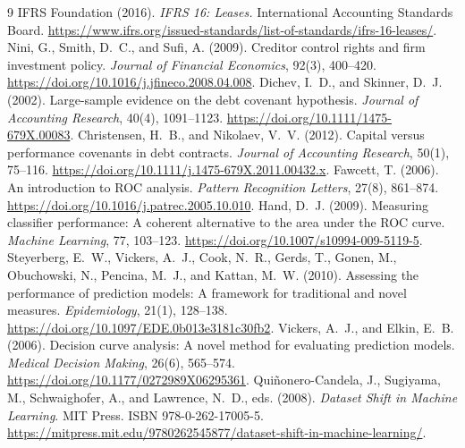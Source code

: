 \documentclass[11pt,a4paper]{article}
\begin{document}
\FloatBarrier
\begin{thebibliography}{9}
IFRS Foundation (2016). \emph{IFRS 16: Leases.}
International Accounting Standards Board.
\url{https://www.ifrs.org/issued-standards/list-of-standards/ifrs-16-leases/}.
Nini, G., Smith, D.~C., and Sufi, A. (2009).
Creditor control rights and firm investment policy.
\emph{Journal of Financial Economics}, 92(3), 400--420.
\url{https://doi.org/10.1016/j.jfineco.2008.04.008}.
Dichev, I.~D., and Skinner, D.~J. (2002).
Large-sample evidence on the debt covenant hypothesis.
\emph{Journal of Accounting Research}, 40(4), 1091--1123.
\url{https://doi.org/10.1111/1475-679X.00083}.
Christensen, H.~B., and Nikolaev, V.~V. (2012).
Capital versus performance covenants in debt contracts.
\emph{Journal of Accounting Research}, 50(1), 75--116.
\url{https://doi.org/10.1111/j.1475-679X.2011.00432.x}.
Fawcett, T. (2006).
An introduction to ROC analysis.
\emph{Pattern Recognition Letters}, 27(8), 861--874.
\url{https://doi.org/10.1016/j.patrec.2005.10.010}.
Hand, D.~J. (2009).
Measuring classifier performance: A coherent alternative to the area under the ROC curve.
\emph{Machine Learning}, 77, 103--123.
\url{https://doi.org/10.1007/s10994-009-5119-5}.
Steyerberg, E.~W., Vickers, A.~J., Cook, N.~R., Gerds, T., Gonen, M., Obuchowski, N., Pencina, M.~J., and Kattan, M.~W. (2010).
Assessing the performance of prediction models: A framework for traditional and novel measures.
\emph{Epidemiology}, 21(1), 128--138.
\url{https://doi.org/10.1097/EDE.0b013e3181c30fb2}.
Vickers, A.~J., and Elkin, E.~B. (2006).
Decision curve analysis: A novel method for evaluating prediction models.
\emph{Medical Decision Making}, 26(6), 565--574.
\url{https://doi.org/10.1177/0272989X06295361}.
Qui\~nonero-Candela, J., Sugiyama, M., Schwaighofer, A., and Lawrence, N.~D., eds. (2008).
\emph{Dataset Shift in Machine Learning}.
MIT Press. ISBN 978-0-262-17005-5.
\url{https://mitpress.mit.edu/9780262545877/dataset-shift-in-machine-learning/}.
\end{thebibliography}
\end{document}
